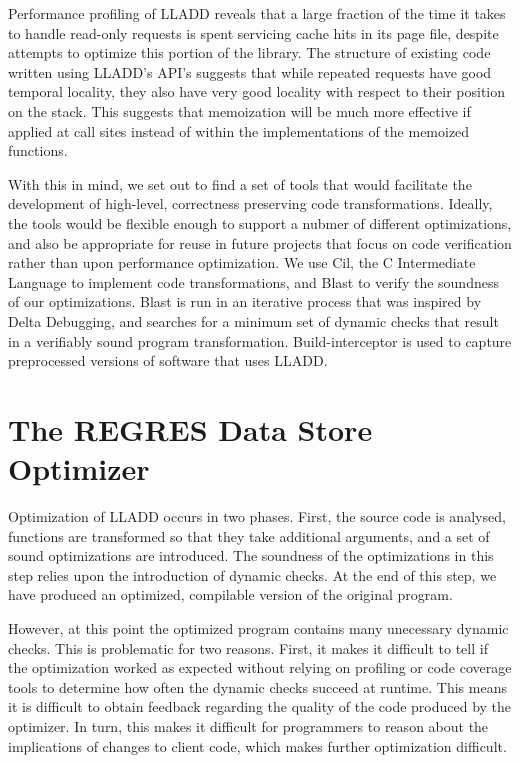 \documentclass[10pt,letterpaper,twocolumn,english]{article}
\newcommand{\yad}{LLADD\xspace}
\begin{document}
Performance profiling of \yad reveals that a large fraction of the time it
takes to handle read-only requests is spent servicing cache hits in
its page file, despite attempts to optimize this portion of the
library.  The structure of existing code written using \yad's API's
suggests that while repeated requests have good temporal locality,
they also have very good locality with respect to their position on
the stack.  This suggests that memoization will be much more effective
if applied at call sites instead of within the implementations of the
memoized functions.

With this in mind, we set out to find a set of tools that would
facilitate the development of high-level, correctness preserving code
transformations.  Ideally, the tools would be flexible enough to
support a nubmer of different optimizations, and also be appropriate
for reuse in future projects that focus on code verification rather
than upon performance optimization.  We use Cil, the C Intermediate
Language to implement code transformations, and Blast to verify the
soundness of our optimizations.  Blast is run in an iterative process
that was inspired by Delta Debugging, and searches for a minimum set
of dynamic checks that result in a verifiably sound program
transformation.  Build-interceptor is used to capture preprocessed
versions of software that uses \yad.


\section{The REGRES Data Store Optimizer}

Optimization of \yad occurs in two phases.  First, the source code is
analysed, functions are transformed so that they take additional
arguments, and a set of sound optimizations are introduced.  The
soundness of the optimizations in this step relies upon the
introduction of dynamic checks.  At the end of this step, we have produced an
optimized, compilable version of the original program.

However, at this point the optimized program contains many unecessary dynamic checks.
  This is problematic for two
reasons.  First, it makes it difficult to tell if the optimization
worked as expected without relying on profiling or code coverage tools
to determine how often the dynamic checks succeed at runtime.  This
means it is difficult to obtain feedback regarding the
quality of the code produced by the optimizer.  In turn, this makes it
difficult for programmers to reason about the implications of changes
to client code, which makes further optimization difficult.  
\end{document}

